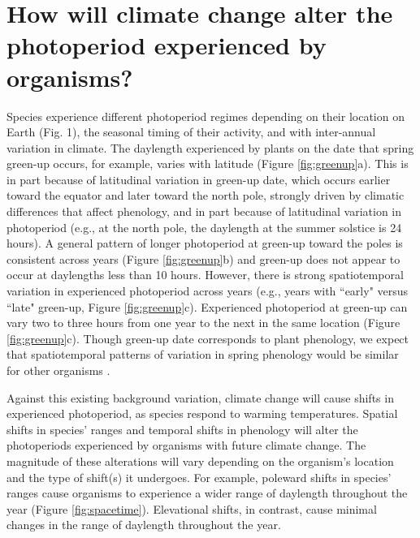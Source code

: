 \documentclass{article}
\begin{document}
\section*{How will climate change alter the photoperiod experienced by organisms?}
\par Species experience different photoperiod regimes depending on their location on Earth (Fig. 1), the seasonal timing of their activity, and with inter-annual variation in climate. The daylength experienced by plants on the date that spring green-up occurs, for example, varies with latitude (Figure \ref{fig:greenup}a). This is in part because of latitudinal variation in green-up date, which occurs earlier toward the equator and later toward the north pole, strongly driven by climatic differences that affect phenology, and in part because of latitudinal variation in photoperiod (e.g., at the north pole, the daylength at the summer solstice is 24 hours). A general pattern of longer photoperiod at green-up toward the poles is consistent across years (Figure \ref{fig:greenup}b) and green-up does not appear to occur at daylengths less than 10 hours. %
However, there is strong spatiotemporal variation in experienced photoperiod across years (e.g., years with ``early" versus ``late" green-up, Figure \ref{fig:greenup}c). Experienced photoperiod at green-up can vary two to three hours from one year to the next in the same location (Figure \ref{fig:greenup}c). Though green-up date corresponds to plant phenology, we expect that spatiotemporal patterns of variation in spring phenology would be similar for other organisms \citep{ovaskainen2013, penuelas2002}.

\par Against this existing background variation, climate change will cause shifts in experienced photoperiod, as species respond to warming temperatures. Spatial shifts in species' ranges and temporal shifts in phenology will alter the photoperiods experienced by organisms with future climate change. The magnitude of these alterations will vary depending on the organism's location and the type of shift(s) it undergoes. For example, poleward shifts in species' ranges cause organisms to experience a wider range of daylength throughout the year (Figure \ref{fig:spacetime}). %
Elevational shifts, in contrast, cause minimal changes in the range of daylength throughout the year. %
\end{document}

